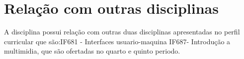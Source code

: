 \documentclass{paper}
\begin{document}
\section{Relação com outras disciplinas}
A disciplina possui relação com outras duas disciplinas apresentadas no perfil curricular que são:IF681 - Interfaces usuario-maquina
IF687- Introdução a multimidia, que são ofertadas no quarto e quinto periodo.




\end{document}
